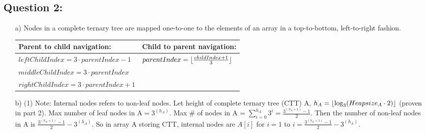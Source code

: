 \documentclass[12pt, oneside]{article}
\DeclarePairedDelimiter\floor{\lfloor}{\rfloor}
\begin{document}
\subsection*{Question 2:}

\begin{itemize}
\item [a)] Nodes in a complete ternary tree are mapped one-to-one to the elements of an array in a top-to-bottom, left-to-right fashion. 
	\begin{center}
	\begin{tabular}{|p{20em}|p{20em}|}
	\hline
	Parent to child navigation: & Child to parent navigation: \\
	\hline
	$leftChildIndex = 3\cdot parentIndex - 1$ & $parentIndex = \floor{\frac{childIndex + 1}{3}}$ \\
	$middleChildIndex = 3\cdot parentIndex$ & \\
	$rightChildIndex = 3\cdot parentIndex + 1$ & \\
	 \hline
	\end{tabular}
	\end{center}
	
\item [b) (1)] Note: Internal nodes refers to non-leaf nodes. \newline
	Let height  of complete ternary tree (CTT) A, $ h_A = \floor{\log_{3}(Heapsize_A\cdot2)}$ (proven in part 2). \newline
	Max number of leaf nodes in A$ = 3^{(h_A)}$. \newline
	Max \# of nodes in A = $\sum_{i=0}^{h_A}3^i = \frac{3^{(h_A+1)}-1}{2}$. \newline
	Then the number of non-leaf nodes in A is $ \frac{3^{(h_A+1)}-1}{2} - 3^{(h_A)}$.\newline
	So in array A storing CTT, internal nodes are $A[i]$ for $i=1$ to $i=\frac{3^{(h_A+1)}-1}{2} - 3^{(h_A)}$.
	

\end{itemize}
\end{document}
